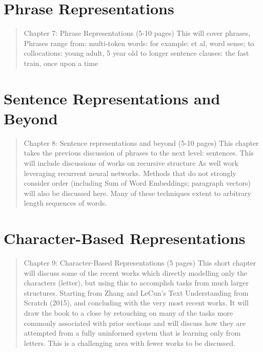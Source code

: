 \documentclass[12pt,parskip]{komatufte}
\begin{document}








\chapter{Phrase Representations}\label{sec:phrase-representations}
\begin{abstract}
Chapter 7: Phrase Representations (5-10 pages)
This will cover phrases, 
Phrases range from:
multi-token words: for example: et al, word sense;
to collocations: young adult, 5 year old
to longer sentence clauses: the fast train, once upon a time
\end{abstract}

\chapter{Sentence Representations and Beyond}\label{sec:sentence-representations-and-beyond}
\begin{abstract}
Chapter 8: Sentence representations and beyond (5-10 pages)
This chapter takes the previous discussion of phrases to the next level: sentences.
This will include discussions of works on recursive structure
As well work leveraging recurrent neural networks.
Methods that do not strongly consider order (including Sum of Word Embeddings; paragraph vectors) will also be discussed here.
Many of these techniques extent to arbitrary length sequences of words.
\end{abstract}

\chapter{Character-Based Representations}\label{sec:character-based-representations}
\begin{abstract}
	Chapter 9: Character-Based Representations (5 pages)
This short chapter will discuss some of the recent works which directly modelling only the characters (letter), but using this to accomplish tasks from much larger structures.
Starting from Zhang and LeCun’s Text Understanding from Scratch (2015), and concluding with the very most recent works.
It will draw the book to a close by retouching on many of the tasks more commonly associated with prior sections and will discuss how they are attempted from a fully uninformed system that is learning only from letters.
This is a challenging area with fewer works to be discussed.
\end{abstract}
\end{document}
